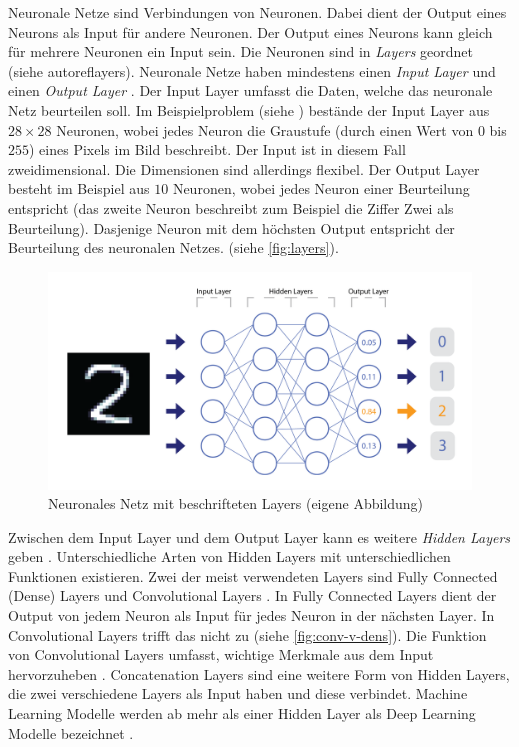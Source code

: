 Neuronale Netze sind Verbindungen von Neuronen. Dabei dient der Output eines
Neurons als Input für andere Neuronen. Der Output eines Neurons kann gleich
für mehrere Neuronen ein Input sein. Die Neuronen sind in \emph{Layers} geordnet
(siehe autoref{layers}). Neuronale Netze haben mindestens einen \emph{Input
Layer} und einen \emph{Output Layer}
\cite{nielsen_neural_2015}\cite{ognjanovski_everything_2020}. Der Input Layer
umfasst die Daten, welche das neuronale Netz beurteilen soll. Im
Beispielproblem (siehe ) bestände der Input Layer aus
$28\times28$ Neuronen, wobei jedes Neuron die Graustufe (durch einen Wert von
$0$ bis $255$) eines Pixels im Bild beschreibt. Der Input ist in diesem Fall
zweidimensional. Die Dimensionen sind allerdings flexibel. Der Output Layer
besteht im Beispiel aus $10$ Neuronen, wobei jedes Neuron einer Beurteilung
entspricht (das zweite Neuron beschreibt zum Beispiel die Ziffer Zwei als
Beurteilung). Dasjenige Neuron mit dem höchsten Output entspricht der
Beurteilung des neuronalen Netzes. (siehe \autoref{fig:layers}).

\newpage
\begin{figure}[!ht]
   \centering
   \includegraphics[width=\textwidth-2cm]{images/theorie/layers.png}
   \caption{Neuronales Netz mit beschrifteten Layers (eigene Abbildung)}\label{fig:layers}
\end{figure}
 
Zwischen dem Input Layer und dem Output Layer kann es weitere \emph{Hidden
Layers} geben \cite{malik_what_2019}. Unterschiedliche Arten von Hidden Layers
mit unterschiedlichen Funktionen existieren. Zwei der meist verwendeten Layers
sind Fully Connected (Dense) Layers und Convolutional Layers
\cite{unzueta_convolutional_2022}. In Fully Connected Layers dient der Output
von jedem Neuron als Input für jedes Neuron in der nächsten Layer. In
Convolutional Layers trifft das nicht zu (siehe \autoref{fig:conv-v-dens}). Die
Funktion von Convolutional Layers umfasst, wichtige Merkmale aus dem Input
hervorzuheben \cite{deshpande_beginners_nodate}. Concatenation Layers
\cite{jayawardana_concatenating_2021} sind eine weitere Form von Hidden Layers,
die zwei verschiedene Layers als Input haben und diese verbindet. Machine
Learning Modelle werden ab mehr als einer Hidden Layer als Deep Learning Modelle
bezeichnet \cite{jan-dirk_kranz_deep_2019}.
 
